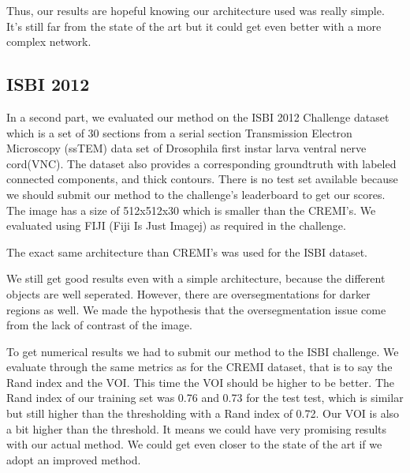 Thus, our results are hopeful knowing our architecture used was really simple.\\ 
It's still far from the state of the art but it could get even better with a more complex network.\\

\subsection{ISBI 2012}
In a second part, we evaluated our method on the ISBI 2012 Challenge dataset which is a set of 30 sections from a serial section Transmission Electron Microscopy (ssTEM) data set of Drosophila first instar larva ventral nerve cord(VNC).
The dataset also provides a corresponding groundtruth with labeled connected components, and thick contours.
There is no test set available because we should submit our method to the challenge's leaderboard to get our scores.
The image has a size of 512x512x30 which is smaller than the CREMI's.
We evaluated using FIJI (Fiji Is Just Imagej) as required in the challenge.

The exact same architecture than CREMI's was used for the ISBI dataset.

We still get good results even with a simple architecture, because the different objects are well seperated.
However, there are oversegmentations for darker regions as well.
We made the hypothesis that the oversegmentation issue come from the lack of contrast of the image.

To get numerical results we had to submit our method to the ISBI challenge.
We evaluate through the same metrics as for the CREMI dataset, that is to say the Rand index and the VOI.
This time the VOI should be higher to be better.
The Rand index of our training set was 0.76 and 0.73 for the test test, which is similar but still higher than the thresholding with a Rand index of 0.72.
Our VOI is also a bit higher than the threshold. 
It means we could have very promising results with our actual method.
We could get even closer to the state of the art if we adopt an improved method.


